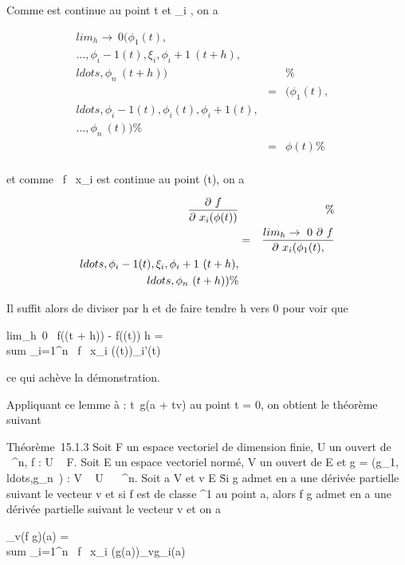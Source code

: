 \documentclass[]{article}
\begin{document}
Comme \phi est continue au point t et \xi_i , on a

\begin{align*}
lim_h\rightarrow~0(\phi_1(t),\\\ldots,\phi_i-1(t),\xi_i,\phi_i+1~(t
+
h),\\ldots,\phi_n~(t
+ h))&&\%& \\ & =&
(\phi_1(t),\\ldots,\phi_i-1(t),\phi_i(t),\phi_i+1(t),\\\ldots,\phi_n~(t))\%&
\\ & =& \phi(t) \%&
\\ \end{align*}

et comme  \partial~f \over \partial~x_i est continue au
point \phi(t), on a

\begin{align*} \partial~f \over
\partial~x_i (\phi(t))&& \%& \\ & =&
lim_h\rightarrow~0~ \partial~f \over
\partial~x_i
(\phi_1(t),\\ldots,\phi_i-1(t),\xi_i,\phi_i+1~(t
+
h),\\ldots,\phi_n~(t
+ h))\%& \\
\end{align*}

Il suffit alors de diviser par h et de faire tendre h vers 0 pour voir
que

lim_h\rightarrow~0~ f(\phi(t + h)) - f(\phi(t))
\over h = \\sum
_i=1^n \partial~f \over \partial~x_i
(\phi(t))\phi_i'(t)

ce qui achève la démonstration.

Appliquant ce lemme à \phi : t\mapsto~g(a + tv) au
point t = 0, on obtient le théorème suivant

Théorème~15.1.3 Soit F un espace vectoriel de dimension finie, U un
ouvert de ~^n, f : U \rightarrow~ F. Soit E un espace vectoriel normé, V
un ouvert de E et g =
(g_1,\\ldots,g_n~)
: V \rightarrow~ U \subset~ ~^n. Soit a \in V et v \in E
\diagdown\0\. Si g admet en a une dérivée
partielle suivant le vecteur v et si f est de classe ^1 au
point a, alors f \cdot g admet en a une dérivée partielle suivant le vecteur
v et on a

\partial_v(f \cdot g)(a) = \\sum
_i=1^n \partial~f \over \partial~x_i
(g(a))\partial_vg_i(a)
\end{document}

